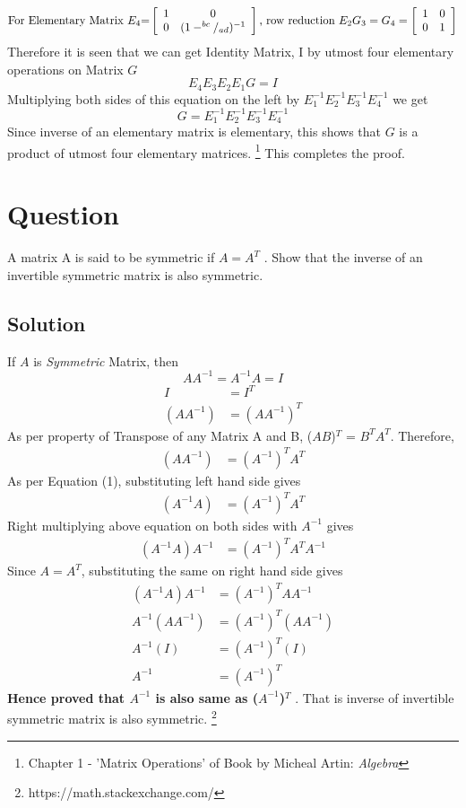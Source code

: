 \documentclass[12pt]{article}
\newcommand\tab[1][1cm]{\hspace*{#1}}
\begin{document}
\[ \textnormal{For Elementary Matrix $E_4$=} \left[ \begin{array}{cc}
  1 & 0 \\
  0 & (1-^{bc}/_{ad})^{-1}
\end{array} \right]
\textnormal{, row reduction } E_2G_3 = G_4 =
\left[ \begin{array}{cc}
  1 & 0 \\
  0 & 1
\end{array} \right]
\]
\noindent
\tab Therefore it is seen that we can get Identity Matrix, I by utmost four elementary operations on Matrix $G$
$$
E_4E_3E_2E_1G = I
$$
\noindent
\tab Multiplying both sides of this equation on the left by $E_1^{-1}E_2^{-1}E_3^{-1}E_4^{-1}$ we get 
$$
G = E_1^{-1}E_2^{-1}E_3^{-1}E_4^{-1}
$$
\noindent
\tab Since inverse of an elementary matrix is elementary, this shows that $G$ is a product of utmost four elementary matrices. \footnote{Chapter 1 - 'Matrix Operations' of Book by Micheal Artin: \textit{Algebra}} This completes the proof.

\clearpage
\section{Question}
A matrix A is said to be symmetric if $A = A^T$ . Show that the inverse of an invertible symmetric matrix is also symmetric.
\subsection{Solution}
\noindent
\tab If $A$ is \textit{Symmetric} Matrix, then 
\begin{equation}
AA^{-1} = A^{-1}A = I
\end{equation}
\noindent
\begin{align*}
	I &= I^{T} \\
    (AA^{-1}) &= (AA^{-1})^T
\end{align*}
\noindent
\tab As per property of Transpose of any Matrix A and B, ($AB$)$^T$ = $B^TA^T$. Therefore,
\noindent 
\begin{align*}
	(AA^{-1}) &= (A^{-1})^T A^T
\end{align*}
\noindent 
\tab As per Equation (1), substituting left hand side gives
\begin{align*}
	(A^{-1}A) &= (A^{-1})^T A^T
\end{align*}
\noindent 
\tab Right multiplying above equation on both sides with $A^{-1}$ gives
\begin{align*}
	(A^{-1}A)A^{-1} &= (A^{-1})^T A^T A^{-1}
\end{align*}
\noindent 
\tab Since $A = A^T$, substituting the same on right hand side gives
\begin{align*}
	(A^{-1}A)A^{-1} &= (A^{-1})^T A A^{-1}\\
    A^{-1}(AA^{-1}) &= (A^{-1})^T (A A^{-1})\\
    A^{-1}(I) &= (A^{-1})^T (I)\\
    A^{-1} &= (A^{-1})^T
\end{align*}
\noindent
\tab \textbf{Hence proved that $A^{-1}$ is also same as ($A^{-1}$)$^T$ }. That is inverse of invertible symmetric matrix is also symmetric. \footnote{https://math.stackexchange.com/}
\end{document}
